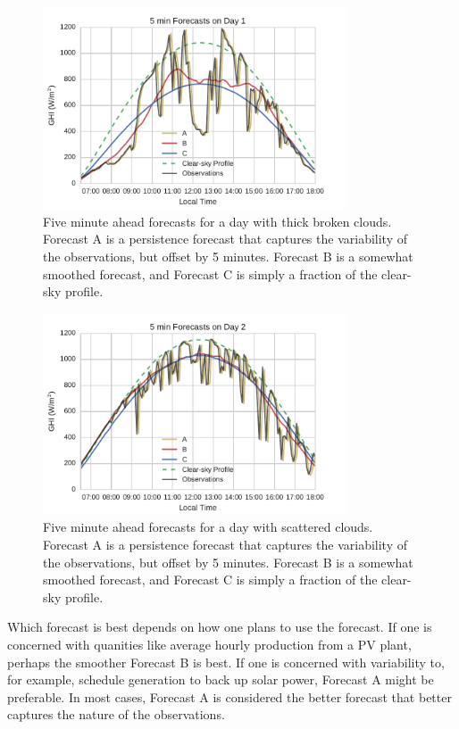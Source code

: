 \begin{figure}[tbp]
\centering
\includegraphics[width=0.8\textwidth]{figs/error_fx_Day_1.pdf}
\caption[Forecasts for a day with thick, broken clouds]{Five minute
  ahead forecasts for a day with thick broken clouds. Forecast A is a
  persistence forecast that captures the variability of the
  observations, but offset by 5 minutes. Forecast B is a somewhat
  smoothed forecast, and Forecast C is simply a fraction of the
  clear-sky profile.}
\label{fig:5minfx_day1}
\end{figure}

\begin{figure}[tbp]
\centering
\includegraphics[width=0.8\textwidth]{figs/error_fx_Day_2.pdf}
\caption[Forecasts for a day with scattered clouds]{Five minute
  ahead forecasts for a day with scattered clouds. Forecast A is a
  persistence forecast that captures the variability of the
  observations, but offset by 5 minutes. Forecast B is a somewhat
  smoothed forecast, and Forecast C is simply a fraction of the
  clear-sky profile.}
\label{fig:5minfx_day2}
\end{figure}

Which forecast is best depends on how one plans to use the forecast.
If one is concerned with quanities like average hourly production from
a PV plant, perhaps the smoother Forecast B is best.
If one is concerned with variability to, for example, schedule
generation to back up solar power, Forecast A might be preferable.
In most cases, Forecast A is considered the better forecast that
better captures the nature of the observations.

